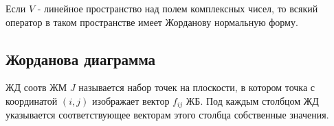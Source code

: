 \begin{corollary}
    Если $V$ - линейное пространство над полем комплексных чисел, то всякий оператор в таком пространстве имеет Жорданову нормальную форму.
\end{corollary}

\subsection{Жорданова диаграмма}

\begin{definition}
    ЖД соотв ЖМ $J$ называется набор точек на плоскости, в котором точка с координатой $(i, j)$ 
    изображает вектор $f_{ij}$ ЖБ. Под каждым столбцом ЖД указывается соответствующее векторам этого 
    столбца собственные значения.
\end{definition}

